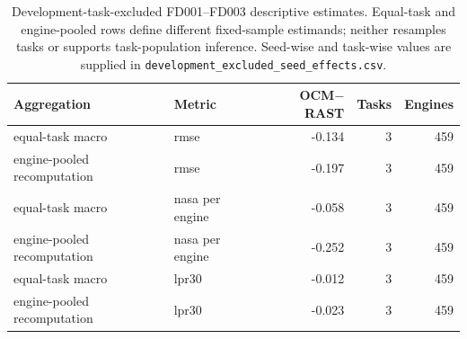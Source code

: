 \begin{table}[!t]
\centering
\small
\caption{Development-task-excluded FD001--FD003 descriptive estimates. Equal-task and engine-pooled rows define different fixed-sample estimands; neither resamples tasks or supports task-population inference. Seed-wise and task-wise values are supplied in \texttt{development\_excluded\_seed\_effects.csv}.}
\label{tab:development-excluded-summary}
\begin{tabular}{llrrr}
\toprule
Aggregation & Metric & OCM$-$RAST & Tasks & Engines \\
\midrule
equal-task macro & rmse & -0.134 & 3 & 459 \\
engine-pooled recomputation & rmse & -0.197 & 3 & 459 \\
equal-task macro & nasa per engine & -0.058 & 3 & 459 \\
engine-pooled recomputation & nasa per engine & -0.252 & 3 & 459 \\
equal-task macro & lpr30 & -0.012 & 3 & 459 \\
engine-pooled recomputation & lpr30 & -0.023 & 3 & 459 \\
\bottomrule
\end{tabular}
\end{table}
